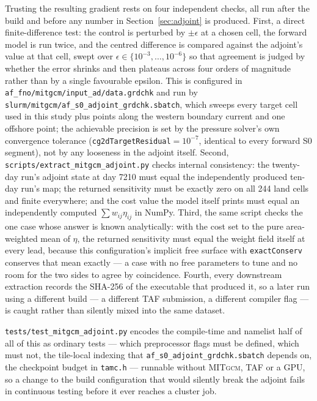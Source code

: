 \documentclass[3p,12pt]{elsarticle}
\newcommand{\MITgcm}{\textsc{MITgcm}}
\begin{document}
Trusting the resulting gradient rests on four independent checks, all run
after the build and before any number in Section~\ref{sec:adjoint} is
produced. First, a direct finite-difference test: the control is perturbed by
$\pm\epsilon$ at a chosen cell, the forward model is run twice, and the
centred difference is compared against the adjoint's value at that cell,
swept over $\epsilon\in\{10^{-3},\dots,10^{-6}\}$ so that agreement is judged
by whether the error shrinks and then plateaus across four orders of
magnitude rather than by a single favourable epsilon. This is configured in
\texttt{af\_fno/mitgcm/input\_ad/data.grdchk} and run by
\texttt{slurm/mitgcm/af\_s0\_adjoint\_grdchk.sbatch}, which sweeps every
target cell used in this study plus points along the western boundary current
and one offshore point; the achievable precision is set by the pressure
solver's own convergence tolerance (\texttt{cg2dTargetResidual}$=10^{-7}$,
identical to every forward S0 segment), not by any looseness in the adjoint
itself. Second, \texttt{scripts/extract\_mitgcm\_adjoint.py} checks internal
consistency: the twenty-day run's adjoint state at day 7210 must equal the
independently produced ten-day run's map; the returned sensitivity must be
exactly zero on all 244 land cells and finite everywhere; and the cost value
the model itself prints must equal an independently computed
$\sum w_{ij}\eta_{ij}$ in NumPy. Third, the same script checks the one case
whose answer is known analytically: with the cost set to the pure
area-weighted mean of $\eta$, the returned sensitivity must equal the weight
field itself at every lead, because this configuration's implicit free
surface with \texttt{exactConserv} conserves that mean exactly --- a case
with no free parameters to tune and no room for the two sides to agree by
coincidence. Fourth, every downstream extraction records the SHA-256 of the
executable that produced it, so a later run using a different build --- a
different TAF submission, a different compiler flag --- is caught rather than
silently mixed into the same dataset.

\texttt{tests/test\_mitgcm\_adjoint.py} encodes the compile-time and namelist
half of all of this as ordinary tests --- which preprocessor flags must be
defined, which must not, the tile-local indexing that
\texttt{af\_s0\_adjoint\_grdchk.sbatch} depends on, the checkpoint budget in
\texttt{tamc.h} --- runnable without \MITgcm{}, TAF or a GPU, so a change to
the build configuration that would silently break the adjoint fails in
continuous testing before it ever reaches a cluster job.
\end{document}
